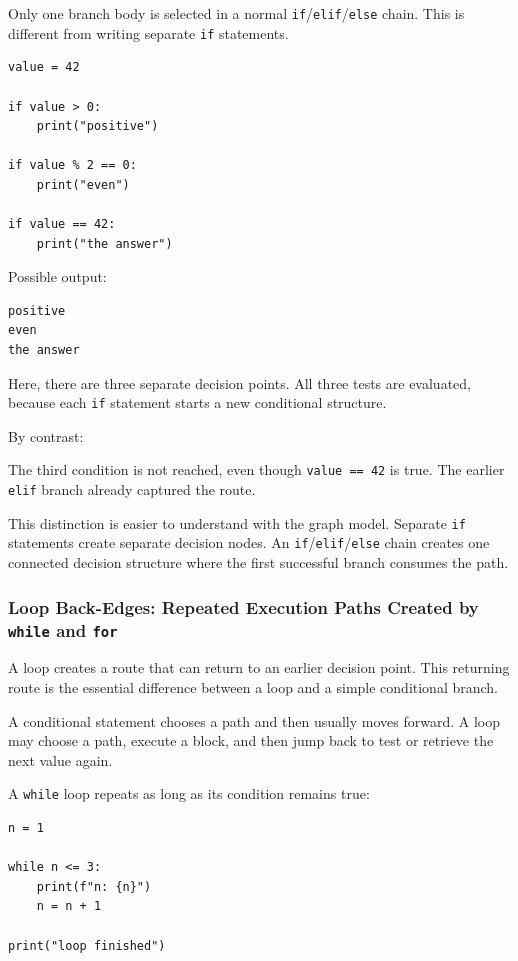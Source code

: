 Only one branch body is selected in a normal \texttt{if}/\texttt{elif}/\texttt{else} chain. This is different from writing separate \texttt{if} statements.

\begin{verbatim}
value = 42

if value > 0:
    print("positive")

if value % 2 == 0:
    print("even")

if value == 42:
    print("the answer")
\end{verbatim}

Possible output:

\begin{verbatim}
positive
even
the answer
\end{verbatim}

Here, there are three separate decision points. All three tests are evaluated, because each \texttt{if} statement starts a new conditional structure.

By contrast:

The third condition is not reached, even though \texttt{value == 42} is true. The earlier \texttt{elif} branch already captured the route.

This distinction is easier to understand with the graph model. Separate \texttt{if} statements create separate decision nodes. An \texttt{if}/\texttt{elif}/\texttt{else} chain creates one connected decision structure where the first successful branch consumes the path.

\subsubsection{Loop Back-Edges: Repeated Execution Paths Created by \texttt{while} and \texttt{for}}

A loop creates a route that can return to an earlier decision point. This returning route is the essential difference between a loop and a simple conditional branch.

A conditional statement chooses a path and then usually moves forward. A loop may choose a path, execute a block, and then jump back to test or retrieve the next value again.

A \texttt{while} loop repeats as long as its condition remains true:

\begin{verbatim}
n = 1

while n <= 3:
    print(f"n: {n}")
    n = n + 1

print("loop finished")
\end{verbatim}

